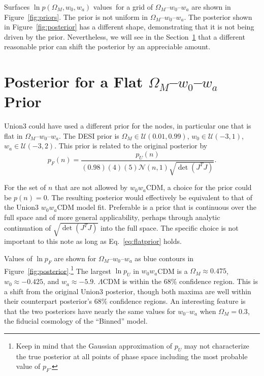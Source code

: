 \documentclass[11pt,a4paper]{article}
\begin{document}
Surfaces   $\ln{p}(\Omega_M, w_0,w_a)$ values\ for a grid of $\Omega_M$--$w_0$--$w_a$ are shown in
Figure~\ref{fig:priors}.   The prior is not uniform in  $\Omega_M$--$w_0$--$w_a$.
The posterior shown in Figure~\ref{fig:posterior} has a different shape,
demonstrating that it is not being driven by the prior.  Nevertheless,
we will see in the  Section~\ref{sec:flatposterior} that a different reasonable prior can shift the posterior
by an appreciable amount.

\section{Posterior for a Flat  $\Omega_M$--$w_0$--$w_a$  Prior}
\label{sec:flatposterior}
Union3 could have used a different prior for the nodes, in particular one
that is flat in $\Omega_M$--$w_0$--$w_a$.
The DESI prior is $\Omega_M \in \mathcal{U}(0.01,0.99)$, $w_0 \in \mathcal{U}(-3,1)$, $w_a \in \mathcal{U}(-3,2)$.
This prior is related to the original posterior by
\begin{equation}
p_F(n) = \frac{p_U(n)}{(0.98)(4)(5) \mathcal{N}(n,1)  \sqrt{\det{\left(J^T J\right)}}}.
\label{eq:flatprior}
\end{equation}

For the set of $n$ that are not allowed by $w_0w_a$CDM,  a choice for the prior could be $p(n)=0$.  The resulting posterior
would effectively be equivalent to that of the Union3 $w_0w_a$CDM model fit.
Preferable is a prior that is continuous over the full space and of more general applicability,
perhaps through analytic continuation of $\sqrt{\det{\left(J^T J\right)}}$ into the full space.
The specific choice is not important to this note as long as Eq.~\ref{eq:flatprior} holds.

Values of $\ln{p}_F$ are shown for  $\Omega_M$--$w_0$--$w_a$ as blue contours in Figure~\ref{fig:posterior}.\footnote{Keep in mind that the Gaussian approximation of $p_U$ may not characterize the true posterior at all points of
phase space including the most probable value of $p_F$.}
The largest $\ln{p_U}$ in $w_0w_a$CDM is a $\Omega_M\approx 0.475$, $w_0 \approx -0.425$, and $w_a \approx -5.9$. $\Lambda$CDM 
is within the 68\% confidence region.  This is a shift from the original Union3 posterior, though both maxima are well within their counterpart
posterior's 68\% confidence regions.  An interesting feature is that the two posteriors have nearly the same values for $w_0$--$w_a$ when $\Omega_M=0.3$, the fiducial cosmology of the ``Binned'' model.
\end{document}
